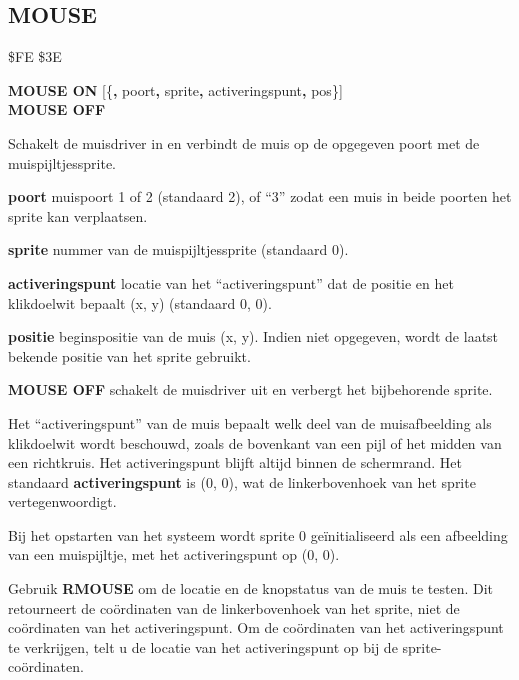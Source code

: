 \subsection{MOUSE}
\begin{description}[leftmargin=2cm,style=nextline]
\item [Token:]    \$FE \$3E

\item [Formaat:]   {\bf MOUSE ON} [\{{\bf,} poort{\bf,} sprite{\bf,} activeringspunt{\bf,} pos\}] \\                 {\bf MOUSE OFF}

\item [Gebruik:]    Schakelt de muisdriver in en verbindt de muis op de opgegeven poort met de muispijltjessprite.

                  {\bf poort} muispoort 1 of 2 (standaard 2), of ``3'' zodat een muis in beide poorten het sprite kan verplaatsen.

                  {\bf sprite} nummer van de muispijltjessprite (standaard 0).

                  {\bf activeringspunt} locatie van het ``activeringspunt'' dat de positie en het klikdoelwit bepaalt (x, y) (standaard 0, 0).

                  {\bf positie} beginspositie van de muis (x, y). Indien niet opgegeven, wordt de laatst bekende positie van het sprite gebruikt.

                  {\bf MOUSE OFF} schakelt de muisdriver uit en verbergt het bijbehorende sprite.

\item [Opmerkingen:]  Het ``activeringspunt'' van de muis bepaalt welk deel van de muisafbeelding als klikdoelwit wordt beschouwd, zoals de bovenkant van een pijl of het midden van een richtkruis. Het activeringspunt blijft altijd binnen de schermrand. Het standaard {\bf activeringspunt} is (0, 0), wat de linkerbovenhoek van het sprite vertegenwoordigt.

                  Bij het opstarten van het systeem wordt sprite 0 geïnitialiseerd als een afbeelding van een muispijltje, met het activeringspunt op (0, 0).

                  Gebruik {\bf RMOUSE} om de locatie en de knopstatus van de muis te testen. Dit retourneert de coördinaten van de linkerbovenhoek van het sprite, niet de coördinaten van het activeringspunt. Om de coördinaten van het activeringspunt te verkrijgen, telt u de locatie van het activeringspunt op bij de sprite-coördinaten.


\end{description}
